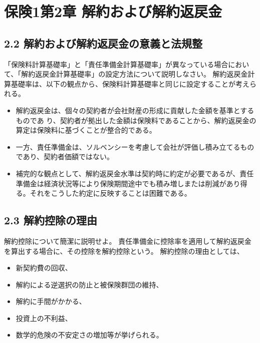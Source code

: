 \documentclass[report,gutter=10mm,fore-edge=10mm,uplatex,dvipdfmx]{jlreq}
\begin{document}
\chapter{保険1第2章 解約および解約返戻金}
\section{2.2 解約および解約返戻金の意義と法規整}
「保険料計算基礎率」と「責任準備金計算基礎率」が異なっている場合において、「解約返戻金計算基礎率」の設定方法について説明しなさい。
解約返戻金計算基礎率は、以下の観点から、保険料計算基礎率と同じに設定することが考えられる。  
\begin{itemize}
\item 解約返戻金は、個々の契約者が会社財産の形成に貢献した金額を基準とするものであ  り、契約者が拠出した金額は保険料であることから、解約返戻金の算定は保険料に基づくことが整合的である。
\item 一方、責任準備金は、ソルベンシーを考慮して会社が評価し積み立てるものであり、契約者価額ではない。
\item 補完的な観点として、解約返戻金水準は契約時に約定が必要であるが、責任準備金は経済状況等により保険期間途中でも積み増しまたは削減があり得る。それをこうした約定に反映することは困難である。
\end{itemize}

\section{2.3 解約控除の理由}

解約控除について簡潔に説明せよ。
責任準備金に控除率を適用して解約返戻金を算出する場合に、その控除を解約控除という。
解約控除の理由としては、
\begin{itemize}
\item 新契約費の回収、
\item 解約による逆選択の防止と被保険群団の維持、
\item 解約に手間がかかる、
\item 投資上の不利益、
\item 数学的危険の不安定さの増加等が挙げられる。
\end{itemize}
\end{document}
